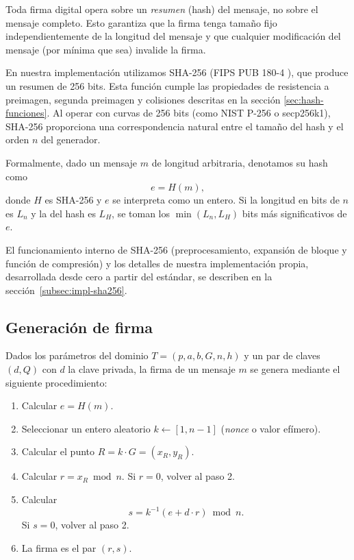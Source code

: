 Toda firma digital opera sobre un \emph{resumen} (hash) del mensaje, no sobre el mensaje completo. Esto garantiza que la firma tenga tamaño fijo independientemente de la longitud del mensaje y que cualquier modificación del mensaje (por mínima que sea) invalide la firma.

En nuestra implementación utilizamos SHA-256 (FIPS PUB 180-4 \cite{nist-fips180-4}), que produce un resumen de 256 bits. Esta función cumple las propiedades de resistencia a preimagen, segunda preimagen y colisiones descritas en la sección \ref{sec:hash-funciones}. Al operar con curvas de 256 bits (como NIST P-256 o secp256k1), SHA-256 proporciona una correspondencia natural entre el tamaño del hash y el orden $n$ del generador.

Formalmente, dado un mensaje $m$ de longitud arbitraria, denotamos su hash como
\[
    e = H(m),
\]
donde $H$ es SHA-256 y $e$ se interpreta como un entero. Si la longitud en bits de $n$ es $L_n$ y la del hash es $L_H$, se toman los $\min(L_n, L_H)$ bits más significativos de $e$.

El funcionamiento interno de SHA-256 (preprocesamiento, expansión de bloque y función de compresión) y los detalles de nuestra implementación propia, desarrollada desde cero a partir del estándar, se describen en la sección~\ref{subsec:impl-sha256}.


\subsection{Generación de firma}
\label{subsec:ecdsa-firma}

Dados los parámetros del dominio $T = (p, a, b, G, n, h)$ y un par de claves $(d, Q)$ con $d$ la clave privada, la firma de un mensaje $m$ se genera mediante el siguiente procedimiento:

\begin{enumerate}
    \item Calcular $e = H(m)$.
    \item Seleccionar un entero aleatorio $k \leftarrow [1, n-1]$ (\emph{nonce} o valor efímero).
    \item Calcular el punto $R = k \cdot G = (x_R, y_R)$.
    \item Calcular $r = x_R \bmod n$. Si $r = 0$, volver al paso 2.
    \item Calcular
    \[
        s = k^{-1} (e + d \cdot r) \bmod n.
    \]
    Si $s = 0$, volver al paso 2.
    \item La firma es el par $(r, s)$.
\end{enumerate}

